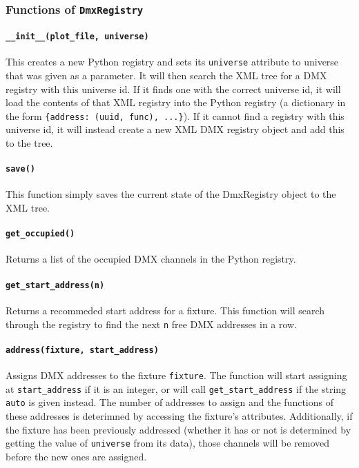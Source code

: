 \documentclass[a4paper]{article}
\begin{document}
\subsubsection{Functions of \texttt{DmxRegistry}}

\paragraph{\texttt{\_\_init\_\_(plot\_file, universe)}}
This creates a new Python registry and sets its \texttt{universe} attribute 
to universe that was given as a parameter. It will then search the XML tree 
for a DMX registry with this universe id. If it finds one with the correct 
universe id, it will load the contents of that XML registry into the Python 
registry (a dictionary in the form \texttt{\{address: (uuid, func), ...\}}).
If it cannot find a registry with this universe id, it will instead create a 
new XML DMX registry object and add this to the tree.

\paragraph{\texttt{save()}}
This function simply saves the current state of the DmxRegistry object to the 
XML tree. 

\paragraph{\texttt{get\_occupied()}}
Returns a list of the occupied DMX channels in the Python registry.

\paragraph{\texttt{get\_start\_address(n)}}
Returns a recommeded start address for a fixture. This function will search 
through the registry to find the next \texttt{n} free DMX addresses in a row.

\paragraph{\texttt{address(fixture, start\_address)}}
Assigns DMX addresses to the fixture \texttt{fixture}. The function will start 
assigning at \texttt{start\_address} if it is an integer, or will call 
\texttt{get\_start\_address} if the string \texttt{auto} is given instead. 
The number of addresses to assign and the functions of these addresses is 
deterimned by accessing the fixture's attributes. Additionally, if the 
fixture has been previously addressed (whether it has or not is determined by 
getting the value of \texttt{universe} from its data), those channels will be 
removed before the new ones are assigned.
\end{document}
